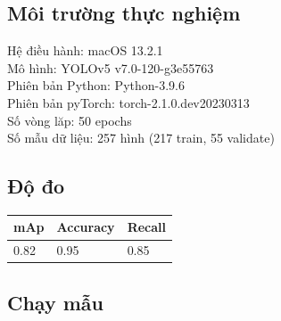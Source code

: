 \documentclass [10pt, fancyhdr, twoside] {article}
\begin{document}
\subsection{Môi trường thực nghiệm}
Hệ điều hành: macOS 13.2.1 \\
Mô hình: YOLOv5 v7.0-120-g3e55763 \\ 
Phiên bản Python: Python-3.9.6 \\
Phiên bản pyTorch: torch-2.1.0.dev20230313 \\
Số vòng lăp: 50 epochs \\
Số mẫu dữ liệu: 257 hình (217 train, 55 validate)
\subsection{Độ đo}
\begin{tabular}{|p{1.25in}|p{1.25in}|p{1.25in}|} 
    \hline
    mAp & Accuracy & Recall\\
    \hline
    0.82 & 0.95 & 0.85
    \\ 
    \hline
\end{tabular}

\subsection{Chạy mẫu}
\begin{figure}[h]
   
    \centering
    
    
\end{figure}
\end{document}
